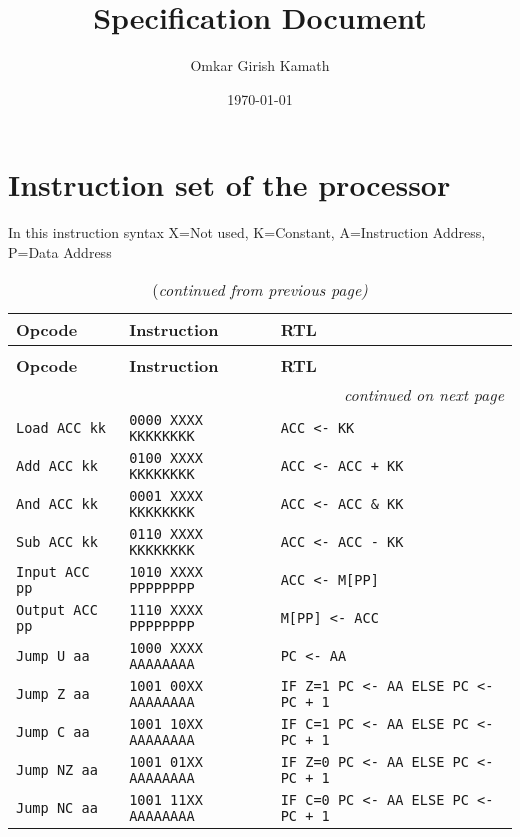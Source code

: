 \documentclass[11pt]{article}
\author{Omkar Girish Kamath}
\date{\today}
\title{Specification Document}
\begin{document}
\maketitle
\tableofcontents

\section{Instruction set of the processor}
\label{sec:org4f08230}

In this instruction syntax X=Not used, K=Constant, A=Instruction Address, P=Data Address

\begin{longtable}{|l|l|l|}
\caption{Instruction Set of the Simple CPU}\\ \hline
{\bf Opcode} & {\bf Instruction} & {\bf RTL} \\ 
\endfirsthead
\caption[]{(\em continued from previous page)}\\
\hline
{\bf Opcode} & {\bf Instruction} & {\bf RTL} \\ \hline 
\endhead
\multicolumn{3}{|r|}{{\em continued on next page}} \\ \hline
\endfoot
\endlastfoot
\hline \hline
\texttt{Load ACC kk} &  \texttt{0000 XXXX KKKKKKKK} & \texttt{ACC <- KK} \\ \hline

\texttt{Add ACC kk} &  \texttt{0100 XXXX KKKKKKKK} & \texttt{ACC <- ACC + KK} \\ \hline

\texttt{And ACC kk} &  \texttt{0001 XXXX KKKKKKKK} &  \texttt{ACC <- ACC \& KK} \\ \hline

\texttt{Sub ACC kk} &  \texttt{0110 XXXX KKKKKKKK} & \texttt{ACC <- ACC - KK} \\ \hline

\texttt{Input ACC pp} &  \texttt{1010 XXXX PPPPPPPP} & \texttt{ACC <- M[PP]} \\ \hline

\texttt{Output ACC pp} &  \texttt{1110 XXXX PPPPPPPP} & \texttt{M[PP] <- ACC} \\ \hline

\texttt{Jump U aa} &  \texttt{1000 XXXX AAAAAAAA} & \texttt{PC <- AA} \\ \hline

\texttt{Jump Z aa} &  \texttt{1001 00XX AAAAAAAA} & \texttt{IF Z=1 PC <- AA ELSE PC <- PC + 1} \\ \hline

\texttt{Jump C aa} &  \texttt{1001 10XX AAAAAAAA} & \texttt{IF C=1 PC <- AA ELSE PC <- PC + 1} \\ \hline

\texttt{Jump NZ aa} &  \texttt{1001 01XX AAAAAAAA} & \texttt{IF Z=0 PC <- AA ELSE PC <- PC + 1} \\ \hline

\texttt{Jump NC aa} &  \texttt{1001 11XX AAAAAAAA} & \texttt{IF C=0 PC <- AA ELSE PC <- PC + 1}\\ \hline

\end{longtable}
\end{document}
